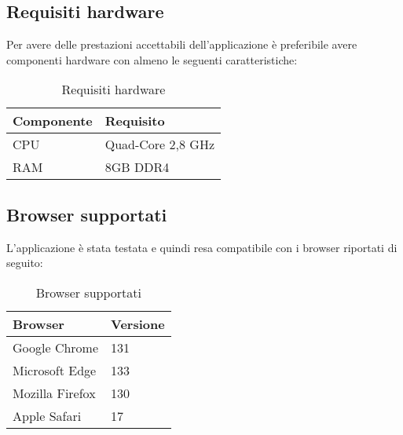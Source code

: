\subsection{Requisiti hardware}

Per avere delle prestazioni accettabili dell’applicazione è preferibile avere componenti hardware con almeno le seguenti caratteristiche:

\begin{table}[h!]
    \centering
    \renewcommand{\arraystretch}{1.6} %
    \begin{tabularx}{0.5\textwidth}{|p{4cm}|X|} \hline
    \rowcolor[HTML]{FFD700} 
    \textbf{Componente} & \textbf{Requisito} \\ 
    \hline
    CPU & Quad-Core 2,8 GHz \\ 
    \hline
    RAM & 8GB DDR4 \\ 
    \hline
    \end{tabularx}
    \caption{Requisiti hardware}
\end{table}


\subsection{Browser supportati}

L’applicazione è stata testata e quindi resa compatibile con i browser riportati di seguito:

\newpage

\begin{table}[h!]
    \centering
    \renewcommand{\arraystretch}{1.6} %
    \begin{tabularx}{0.5\textwidth}{|p{4cm}|X|} \hline
    \rowcolor[HTML]{FFD700} 
    \textbf{Browser} & \textbf{Versione} \\ 
    \hline
    Google Chrome & 131 \\ 
    \hline
    Microsoft Edge & 133 \\ 
    \hline
    Mozilla Firefox & 130 \\
    \hline
    Apple Safari & 17 \\
    \hline
    \end{tabularx}
    \caption{Browser supportati}
\end{table}
